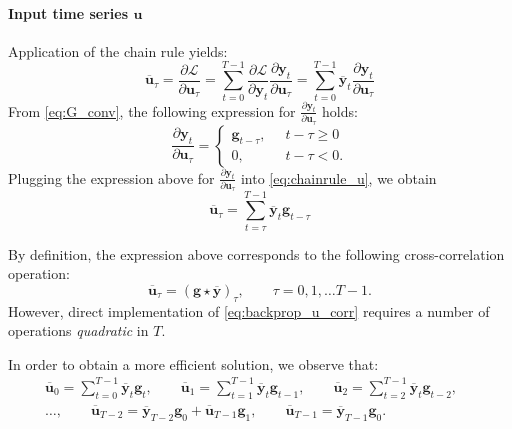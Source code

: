 \documentclass{article}
\newcommand{\adjoint}[1]{\overline{#1}}
\newcommand{\ccorr}{\star}
\newcommand{\tvec}[1]{\mathbf{#1}}
\newcommand{\nsamp}{T}
\newcommand{\pdiff}[2]{\frac{\partial #1}{\partial #2}}
\newcommand{\loss}{\mathcal{L}}
\begin{document}
\paragraph{Input time series  $\tvec{u}$} 
Application of the chain rule yields:
\begin{equation}
\label{eq:chainrule_u}
\adjoint{\tvec{u}}_\tau = \pdiff{\loss}{\tvec{u}_\tau} 
= \sum_{t=0}^{\nsamp-1}{\pdiff{\loss}{\tvec{y}_t} \pdiff{\tvec{y}_t}{\tvec{u}_\tau}} 
= \sum_{t=0}^{\nsamp-1}{\adjoint{\tvec{y}}_t \pdiff{\tvec{y}_t}{\tvec{u}_\tau}} 
\end{equation}
From \eqref{eq:G_conv}, the following expression for $\pdiff{\tvec{y}_t}{\tvec{u}_\tau}$ holds:
\begin{equation}
\pdiff{\tvec{y}_t}{\tvec{u}_\tau} = \begin{cases}
\tvec{g}_{t-\tau},\;\; &t-\tau \geq 0\\
0, \; & t-\tau < 0.
\end{cases}
\end{equation}
Plugging the expression above for $\pdiff{\tvec{y}_t}{\tvec{u}_\tau}$ into \eqref{eq:chainrule_u}, we obtain 
\begin{equation*}
\adjoint{\tvec{u}}_\tau = 
\sum_{t=\tau}^{\nsamp-1}\adjoint{\tvec{y}}_t 
\tvec{g}_{t-\tau} 
\end{equation*}

By definition, the expression above corresponds to the following cross-correlation operation:
\begin{equation}
\label{eq:backprop_u_corr}
\adjoint{\tvec{u}}_\tau = (\tvec{g}  \ccorr \tvec{\adjoint y})_\tau,\qquad \tau=0,1,\dots \nsamp-1.
\end{equation}
However, direct implementation of \eqref{eq:backprop_u_corr} requires a number of operations \emph{quadratic} in  $\nsamp$.

In order to obtain a more efficient solution, we observe that:
\begin{align*}
 &\adjoint{\tvec{u}}_0 = \sum_{t=0}^{\nsamp-1} \adjoint{\tvec{y}}_t \tvec{g}_t, \qquad 
  \adjoint{\tvec{u}}_1 = \sum_{t=1}^{\nsamp-1} \adjoint{\tvec{y}}_t \tvec{g}_{t-1}, \qquad  
  \adjoint{\tvec{u}}_2 = \sum_{t=2}^{\nsamp-1} \adjoint{\tvec{y}}_t \tvec{g}_{t-2}, \qquad \\
 &\dots, \qquad
 \adjoint{\tvec{u}}_{\nsamp-2} = \adjoint{\tvec{y}}_{\nsamp-2} \tvec{g}_0 + \adjoint{\tvec{u}}_{\nsamp-1}\tvec{g}_1, \qquad
  \adjoint{\tvec{u}}_{\nsamp-1} = \adjoint{\tvec{y}}_{\nsamp-1} \tvec{g}_{0}.
 \end{align*}
\end{document}
